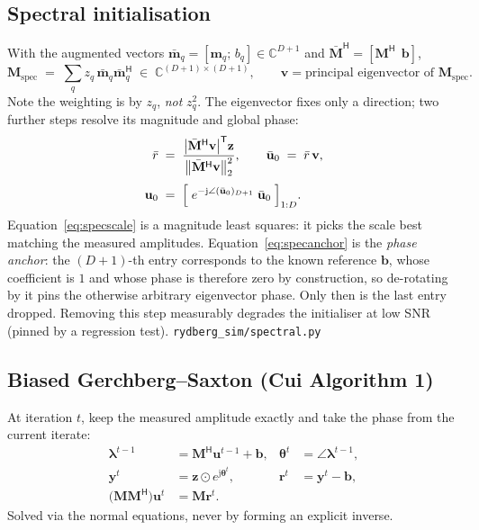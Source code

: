 \documentclass[11pt,a4paper]{article}
\newcommand{\src}[1]{{\footnotesize\color{srcgray}\texttt{#1}}}
\newcommand{\C}{\mathbb{C}}
\newcommand{\herm}{\mathsf{H}}
\newcommand{\trans}{\mathsf{T}}
\newcommand{\mat}[1]{\mathbf{#1}}
\newcommand{\vect}[1]{\mathbf{#1}}
\newcommand{\jj}{\mathrm{j}}
\begin{document}
\subsection{Spectral initialisation}
With the augmented vectors
$\bar{\vect{m}}_q=[\vect{m}_q;\,b_q]\in\C^{D+1}$ and
$\bar{\mat{M}}^{\herm}=[\mat{M}^{\herm}\ \ \vect{b}]$,
\begin{equation}
\mat{M}_{\mathrm{spec}} \;=\;
\sum_q z_q\,\bar{\vect{m}}_q\bar{\vect{m}}_q^{\herm}
\;\in\;\C^{(D+1)\times(D+1)},
\qquad
\vect{v} = \text{principal eigenvector of } \mat{M}_{\mathrm{spec}} .
\label{eq:spec}
\end{equation}
Note the weighting is by $z_q$, \emph{not} $z_q^2$. The eigenvector fixes only
a direction; two further steps resolve its magnitude and global phase:
\begin{align}
\bar r &\;=\;
  \frac{\bigl|\bar{\mat{M}}^{\herm}\vect{v}\bigr|^{\trans}\vect{z}}
       {\bigl\|\bar{\mat{M}}^{\herm}\vect{v}\bigr\|_2^2},
\qquad
\bar{\vect{u}}_0 \;=\; \bar r\,\vect{v},
\label{eq:specscale}\\[1mm]
\vect{u}_0 &\;=\;
  \Bigl[\;
    e^{-\jj\angle(\bar{\vect{u}}_0)_{D+1}}\;\bar{\vect{u}}_0
  \;\Bigr]_{1:D} .
\label{eq:specanchor}
\end{align}
Equation~\eqref{eq:specscale} is a magnitude least squares: it picks the scale
best matching the measured amplitudes. Equation~\eqref{eq:specanchor} is the
\emph{phase anchor}: the $(D{+}1)$-th entry corresponds to the known reference
$\vect{b}$, whose coefficient is $1$ and whose phase is therefore zero by
construction, so de-rotating by it pins the otherwise arbitrary eigenvector
phase. Only then is the last entry dropped. Removing this step measurably
degrades the initialiser at low SNR (pinned by a regression test).
\src{rydberg\_sim/spectral.py}

\subsection{Biased Gerchberg--Saxton (Cui Algorithm 1)}
At iteration $t$, keep the measured amplitude exactly and take the phase from
the current iterate:
\begin{align}
\boldsymbol{\lambda}^{t-1} &= \mat{M}^{\herm}\vect{u}^{t-1}+\vect{b},
& \boldsymbol{\theta}^{t} &= \angle\boldsymbol{\lambda}^{t-1},
\label{eq:gs1}\\
\vect{y}^{t} &= \vect{z}\odot e^{\jj\boldsymbol{\theta}^{t}},
& \vect{r}^{t} &= \vect{y}^{t}-\vect{b},
\label{eq:gs2}\\
\bigl(\mat{M}\mat{M}^{\herm}\bigr)\vect{u}^{t}
  &= \mat{M}\vect{r}^{t} .
\label{eq:gs3}
\end{align}
Solved via the normal equations, never by forming an explicit inverse.
\end{document}
